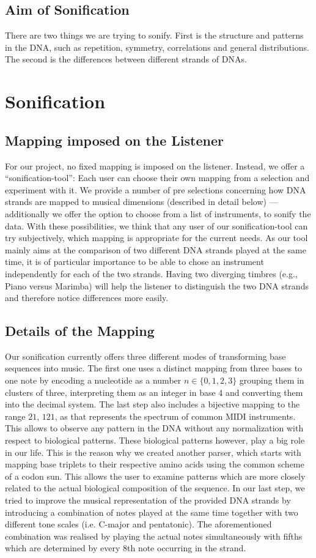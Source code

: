 \documentclass[10pt]{article}
\begin{document}
\subsection{Aim of Sonification}
There are two things we are trying to sonify. First is the structure and patterns in the 
DNA, such as repetition, symmetry, correlations and general distributions. The second is the 
differences between different strands of DNAs. 

\section{Sonification}
\subsection{Mapping imposed on the Listener}
For our project, no fixed mapping is imposed on the listener. Instead, we offer a 
“sonification-tool”: Each user can choose their own mapping from a selection and experiment 
with it. We provide a number of pre selections concerning how DNA strands are mapped to 
musical dimensions (described in detail below) — additionally we offer the option to choose 
from a list of instruments, to sonify the data. With these possibilities, we think that any user 
of our sonification-tool can try subjectively, which mapping is appropriate for the current 
needs. As our tool mainly aims at the comparison of two different DNA strands played at the 
same time, it is of particular importance to be able to chose an instrument independently for 
each of the two strands. Having two diverging timbres (e.g., Piano versus Marimba) will help 
the listener to distinguish the two DNA strands and therefore notice differences more easily.
\subsection{Details of the Mapping}
Our sonification currently offers three different modes of transforming base sequences 
into music. The first one uses a distinct mapping from three bases to one note by encoding a nucleotide as a number $n \in \{0,1,2,3\}$ grouping them in clusters of three, interpreting 
them as an integer in base 4 and converting them into the decimal system. The last step also 
includes a bijective mapping to the range $21$, $121$, as that 
represents the spectrum of common MIDI instruments. This allows to observe any pattern in 
the DNA without any normalization with respect to biological patterns.
These biological patterns however, play a big role in our life. This is the reason why we 
created another parser, which starts with mapping base triplets to their respective amino acids 
using the common scheme of a codon sun. This allows the user to examine 
patterns which are more closely related to the actual biological composition of the sequence.
In our last step, we tried to improve the musical representation of the provided DNA strands 
by introducing a combination of notes played at the same time together with two different 
tone scales (i.e. C-major and pentatonic). The aforementioned combination was realised by 
playing the actual notes simultaneously with fifths which are determined by every 8th note 
occurring in the strand.
\end{document}
